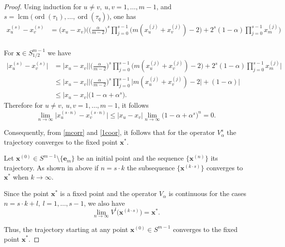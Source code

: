 \documentclass[10pt,a4paper]{amsart}
\DeclareMathOperator{\lcm}{lcm}
\DeclareMathOperator{\ord}{ord}
\begin{document}
\begin{proof}
Using induction for $u\neq v,  \ u,v=1,\dots,m-1$, and $s=\lcm \big(\ord (\tau_1),\dots, \ord (\tau_q)\big)$, one has
\begin{align*}
x_u^{(s)}-x_v^{(s)}&= \big(x_u-x_v\big)\Big(\Big(\frac{\alpha}{ m-2}\Big)^s\prod\limits_{j=0}^{s-1} \big(m(x_u^{(j)}+x_v^{(j)}) - 2\big)
    + 2^s(1-\alpha)\prod\limits_{j=0}^{s-1}x_m^{(j)} \Big) \\
\end{align*}


For $\mathbf{x}\in S^{m-1}_{1/2}$ we have
\begin{align*}
\big|x_u^{(s)}-x_v^{(s)}\big|&=\big|x_u-x_v\big|\bigg| \Big(\frac{\alpha}{m-2}\Big)^s\prod\limits_{j=0}^{s-1} \big(m(x_u^{(j)}+x_v^{(j)}) - 2\big)
    + 2^s(1-\alpha)\prod\limits_{j=0}^{s-1}x_m^{(j)}\bigg|\\
    &\leq \big|x_u-x_v\big| \bigg| \Big(\frac{\alpha}{m-2}\Big)^s\prod\limits_{j=0}^{s-1} \big|m(x_u^{(j)}+x_v^{(j)}) - 2\big|+
     (1-\alpha)\bigg|\\
    &\leq  \big|x_u-x_v\big| \big(1-\alpha+\alpha^s\big).
\end{align*}
Therefore for $u\neq v, \  u,v=1,\dots,m-1$, it follows
\begin{equation}\label{1coor}
\lim\limits_{n\rightarrow\infty} \big|x_u^{(s\cdot n)}-x_v^{(s\cdot n)}\big|\leq \big|x_u-x_v\big| \lim\limits_{n\rightarrow\infty} \big(1-\alpha+\alpha^s\big)^n=0.
\end{equation}

Consequently, from \eqref{mcorr} and \eqref{1coor}, it follows that for the operator $V_\alpha^s$ the trajectory  converges to
the fixed point $\mathbf{x}^*$.

Let $\mathbf{x}^{(0)}\in S^{m-1}\setminus \{\mathbf{e}_m\}$ be an initial point and the sequence  $\big\{\mathbf{x}^{(n)}\big\}$ its trajectory.
As shown in above if $n=s\cdot k$ the subsequence  $\{\mathbf{x}^{(k\cdot s)}\}$ converges to $\mathbf{x}^*$  when $k\rightarrow\infty$.

Since the point $\mathbf{x}^*$ is a fixed point and the operator $V_\alpha$ is continuous
for the cases $n=s\cdot k+l, \  l=1,\dots,s-1$, we also have
\[\lim\limits_{n\rightarrow\infty} V^l\big(\mathbf{x}^{(k\cdot s)}\big) = \mathbf{x}^*.\]

Thus, the trajectory starting at any point $\mathbf{x}^{(0)}\in S^{m-1}$ converges to
the fixed point $\mathbf{x}^*$.
\end{proof}
\end{document}

